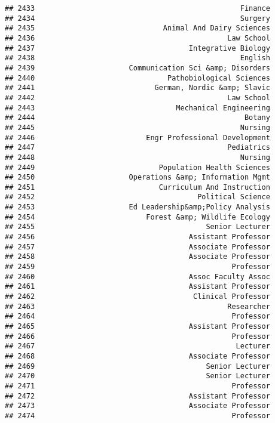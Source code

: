 \documentclass[
]{article}
\begin{document}
\begin{verbatim}
## 2433                                                Finance
## 2434                                                Surgery
## 2435                              Animal And Dairy Sciences
## 2436                                             Law School
## 2437                                    Integrative Biology
## 2438                                                English
## 2439                      Communication Sci &amp; Disorders
## 2440                               Pathobiological Sciences
## 2441                            German, Nordic &amp; Slavic
## 2442                                             Law School
## 2443                                 Mechanical Engineering
## 2444                                                 Botany
## 2445                                                Nursing
## 2446                          Engr Professional Development
## 2447                                             Pediatrics
## 2448                                                Nursing
## 2449                             Population Health Sciences
## 2450                      Operations &amp; Information Mgmt
## 2451                             Curriculum And Instruction
## 2452                                      Political Science
## 2453                      Ed Leadership&amp;Policy Analysis
## 2454                          Forest &amp; Wildlife Ecology
## 2455                                        Senior Lecturer
## 2456                                    Assistant Professor
## 2457                                    Associate Professor
## 2458                                    Associate Professor
## 2459                                              Professor
## 2460                                    Assoc Faculty Assoc
## 2461                                    Assistant Professor
## 2462                                     Clinical Professor
## 2463                                             Researcher
## 2464                                              Professor
## 2465                                    Assistant Professor
## 2466                                              Professor
## 2467                                               Lecturer
## 2468                                    Associate Professor
## 2469                                        Senior Lecturer
## 2470                                        Senior Lecturer
## 2471                                              Professor
## 2472                                    Assistant Professor
## 2473                                    Associate Professor
## 2474                                              Professor

\end{verbatim}
\end{document}
